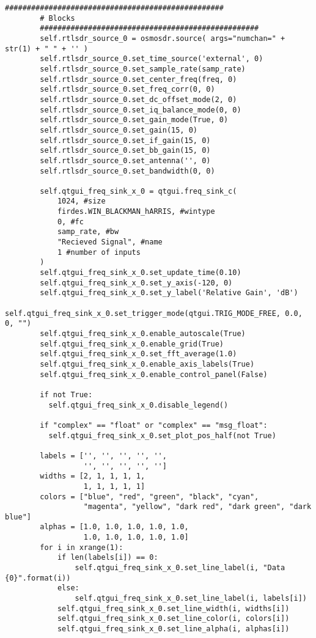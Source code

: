 \begin{lstlisting}[breaklines]
        ##################################################
        # Blocks
        ##################################################
        self.rtlsdr_source_0 = osmosdr.source( args="numchan=" + str(1) + " " + '' )
        self.rtlsdr_source_0.set_time_source('external', 0)
        self.rtlsdr_source_0.set_sample_rate(samp_rate)
        self.rtlsdr_source_0.set_center_freq(freq, 0)
        self.rtlsdr_source_0.set_freq_corr(0, 0)
        self.rtlsdr_source_0.set_dc_offset_mode(2, 0)
        self.rtlsdr_source_0.set_iq_balance_mode(0, 0)
        self.rtlsdr_source_0.set_gain_mode(True, 0)
        self.rtlsdr_source_0.set_gain(15, 0)
        self.rtlsdr_source_0.set_if_gain(15, 0)
        self.rtlsdr_source_0.set_bb_gain(15, 0)
        self.rtlsdr_source_0.set_antenna('', 0)
        self.rtlsdr_source_0.set_bandwidth(0, 0)
          
        self.qtgui_freq_sink_x_0 = qtgui.freq_sink_c(
        	1024, #size
        	firdes.WIN_BLACKMAN_hARRIS, #wintype
        	0, #fc
        	samp_rate, #bw
        	"Recieved Signal", #name
        	1 #number of inputs
        )
        self.qtgui_freq_sink_x_0.set_update_time(0.10)
        self.qtgui_freq_sink_x_0.set_y_axis(-120, 0)
        self.qtgui_freq_sink_x_0.set_y_label('Relative Gain', 'dB')
        self.qtgui_freq_sink_x_0.set_trigger_mode(qtgui.TRIG_MODE_FREE, 0.0, 0, "")
        self.qtgui_freq_sink_x_0.enable_autoscale(True)
        self.qtgui_freq_sink_x_0.enable_grid(True)
        self.qtgui_freq_sink_x_0.set_fft_average(1.0)
        self.qtgui_freq_sink_x_0.enable_axis_labels(True)
        self.qtgui_freq_sink_x_0.enable_control_panel(False)
        
        if not True:
          self.qtgui_freq_sink_x_0.disable_legend()
        
        if "complex" == "float" or "complex" == "msg_float":
          self.qtgui_freq_sink_x_0.set_plot_pos_half(not True)
        
        labels = ['', '', '', '', '',
                  '', '', '', '', '']
        widths = [2, 1, 1, 1, 1,
                  1, 1, 1, 1, 1]
        colors = ["blue", "red", "green", "black", "cyan",
                  "magenta", "yellow", "dark red", "dark green", "dark blue"]
        alphas = [1.0, 1.0, 1.0, 1.0, 1.0,
                  1.0, 1.0, 1.0, 1.0, 1.0]
        for i in xrange(1):
            if len(labels[i]) == 0:
                self.qtgui_freq_sink_x_0.set_line_label(i, "Data {0}".format(i))
            else:
                self.qtgui_freq_sink_x_0.set_line_label(i, labels[i])
            self.qtgui_freq_sink_x_0.set_line_width(i, widths[i])
            self.qtgui_freq_sink_x_0.set_line_color(i, colors[i])
            self.qtgui_freq_sink_x_0.set_line_alpha(i, alphas[i])
        

\end{lstlisting}
